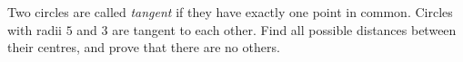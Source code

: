 Two circles are called \emph{tangent} if they have exactly one point in common. Circles with radii $5$ and $3$ are tangent to each other. Find all possible distances between their centres, and prove that there are no others.
